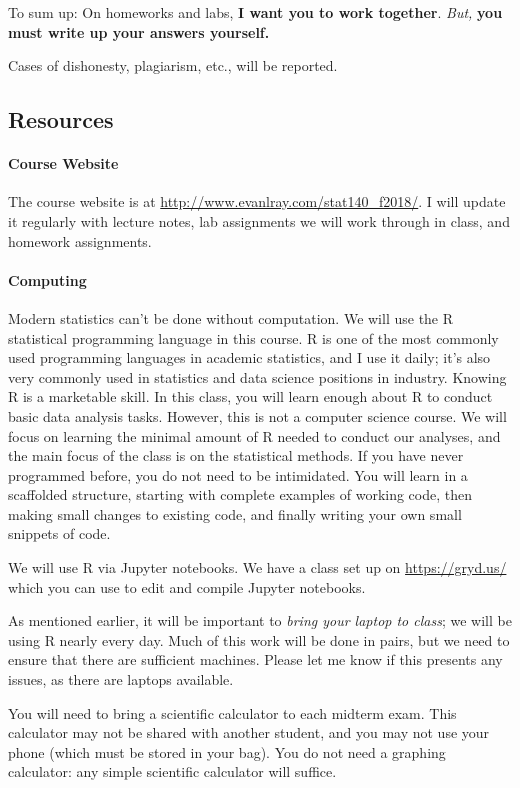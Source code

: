 \documentclass[11pt]{article}
\begin{document}
To sum up: On homeworks and labs, \textbf{I want you to work together}.  \emph{But,} \textbf{you must write up your answers yourself.}

Cases of dishonesty, plagiarism, etc., will be reported.

\subsection*{Resources}

\paragraph{Course Website}
The course website is at \url{http://www.evanlray.com/stat140_f2018/}.  I will update it regularly with lecture notes, lab assignments we will work through in class, and homework assignments.

\paragraph{Computing}
Modern statistics can't be done without computation.  We will use the R statistical programming language in this course.  R is one of the most commonly used programming languages in academic statistics, and I use it daily; it's also very commonly used in statistics and data science positions in industry.  Knowing R is a marketable skill.  In this class, you will learn enough about R to conduct basic data analysis tasks.  However, this is not a computer science course.  We will focus on learning the minimal amount of R needed to conduct our analyses, and the main focus of the class is on the statistical methods.  If you have never programmed before, you do not need to be intimidated.  You will learn in a scaffolded structure, starting with complete examples of working code, then making small changes to existing code, and finally writing your own small snippets of code.

We will use R via Jupyter notebooks.  We have a class set up on \url{https://gryd.us/} which you can use to edit and compile Jupyter notebooks.

As mentioned earlier, it will be important to \emph{bring your laptop to class}; we will be using R nearly every day.  Much of this work will be done in pairs, but we need to ensure that there are sufficient machines.  Please let me know if this presents any issues, as there are laptops available.

You will need to bring a scientific calculator to each midterm exam.  This calculator may not be shared with another student, and you may not use your phone (which must be stored in your bag).  You do not need a graphing calculator: any simple scientific calculator will suffice.
\end{document}
